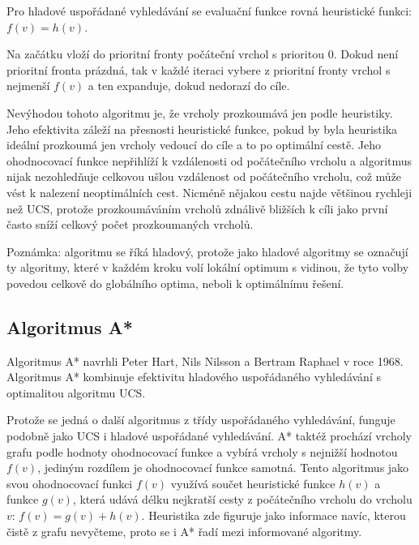 \documentclass[12pt]{report}			%
\begin{document}
			
			Pro hladové uspořádané vyhledávání se evaluační funkce rovná heuristické funkci: $f(v) = h(v)$. 						
			
			Na začátku vloží do prioritní fronty počáteční vrchol s prioritou 0.
			Dokud není prioritní fronta prázdná, tak v každé iteraci vybere z prioritní fronty vrchol s nejmenší $f(v)$ a ten expanduje, dokud nedorazí do cíle.
			
			Nevýhodou tohoto algoritmu je, že vrcholy prozkoumává jen podle heuristiky. %
			Jeho efektivita záleží na přesnosti heuristické funkce, pokud by byla heuristika ideální prozkoumá jen vrcholy vedoucí do cíle a to po optimální cestě. Jeho ohodnocovací funkce nepřihlíží k vzdálenosti od počátečního vrcholu a algoritmus nijak nezohledňuje celkovou ušlou vzdálenost od počátečního vrcholu, což může vést k nalezení neoptimálních cest. Nicméně nějakou cestu najde většinou rychleji než UCS, protože prozkoumáváním vrcholů zdnálivě bližších k cíli jako první často sníží celkový počet prozkoumaných vrcholů.
			
			
			
		
			Poznámka: algoritmu se říká hladový, protože jako hladové algoritmy se označují ty algoritmy, které v každém kroku volí lokální optimum s vidinou, že tyto volby povedou celkově do globálního optima, neboli k optimálnímu řešení. 			
			
			
						
			\subsection{Algoritmus A*}
			Algoritmus A* navrhli Peter Hart, Nils Nilsson a Bertram Raphael v roce 1968. %
			Algoritmus A* kombinuje efektivitu hladového uspořádaného vyhledávání s optimalitou algoritmu UCS.
			
			
			Protože se jedná o další algoritmus z třídy uspořádaného vyhledávání, funguje podobně jako UCS i hladové uspořádané vyhledávání. A* taktéž prochází vrcholy grafu podle hodnoty ohodnocovací funkce a vybírá vrcholy s nejnižší hodnotou $f(v)$, jediným rozdílem je ohodnocovací funkce samotná.
			Tento algoritmus jako svou ohodnocovací funkci $f(v)$ využívá součet heuristické funkce $h(v)$ a funkce $g(v)$, která udává délku nejkratší cesty z počátečního vrcholu do vrcholu $v$: $f(v) = g(v) + h(v)$. Heuristika zde figuruje jako informace navíc, kterou čistě z grafu nevyčteme, proto se i A* řadí mezi informované algoritmy.  
			
\end{document}
